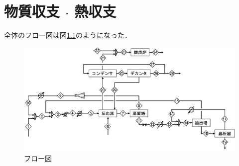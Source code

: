 \documentclass[a4j]{jsreport}
\begin{document}
\newpage
\chapter{物質収支 $\cdot$ 熱収支}
全体のフロー図は図\ref{フロー図}のようになった．
\begin{figure}[htbp]
    \begin{center}
        \includegraphics[scale=0.6]{mat_flow.png}
        \caption{フロー図}
        \label{フロー図}
    \end{center}
\end{figure}
\end{document}
